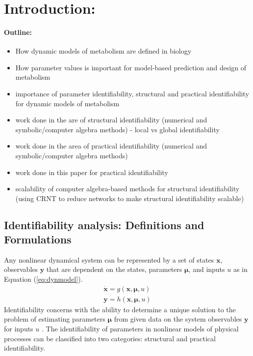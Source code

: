 \documentclass[10pt]{article}
\begin{document}
	\section{Introduction:}
	\paragraph{Outline:}
	\begin{itemize}
		\item How dynamic models of metabolism are defined in biology
		\item How parameter values is important for model-based prediction and design of metabolism
		\item importance of parameter identifiability, structural and practical identifiability for dynamic models of metabolism
		\item work done in the are of structural identifiability (numerical and symbolic/computer algebra methods) - local vs global identifiability
		\item work done in the area of practical identifiability (numerical and symbolic/computer algebra methods)
		\item work done in this paper for practical identifiability
		\item scalability of computer algebra-based methods for structural identifiability (using CRNT to reduce networks to make structural identifiability scalable)
	\end{itemize}
	\subsection{Identifiability analysis: Definitions and Formulations}
	Any nonlinear dynamical system can be represented by a set of states $\mathbf{x}$, observables $\mathbf{y}$ that are dependent on the states, parameters $\mathbf{\mu}$, and inputs $u$ as in Equation (\ref{eq:dynmodel}). 
	\begin{subequations}\label{eq:dynmodel}
		\begin{align}
		\dot{\mathbf{x}} = g(\mathbf{x},\mathbf{\mu},u)\\
		\mathbf{y} = h(\mathbf{x},\mathbf{\mu},u)
		\end{align}
	\end{subequations}
	Identifiability concerns with the ability to determine a unique solution to the problem of estimating parameters $\mathbf{\mu}$ from given data on the system observables $\mathbf{y}$ for inputs $u$ \parencite{McLean2012}.	The identifiability of parameters in nonlinear models of physical processes can be classified into two categories: structural and practical identifiability. 
	
\end{document}
